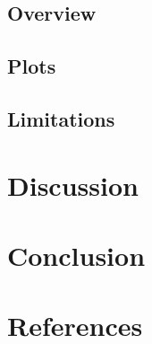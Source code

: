 \documentclass{article}\usepackage[]{graphicx}\usepackage[]{color}
\begin{document}
\subsection{Overview}


\subsection{Plots}



\subsection{Limitations}


\newpage
\section{Discussion}



\newpage
\section{Conclusion}




\newpage
\section{References}


\appendix
\end{document}
